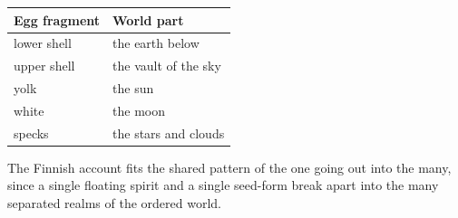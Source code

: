 \begin{longtable}{@{}
ll@{}}
\toprule
Egg fragment & World part \\
\midrule
lower shell & the earth below \\
upper shell & the vault of the sky \\
yolk & the sun \\
white & the moon \\
specks & the stars and clouds \\
\bottomrule
\end{longtable}

The Finnish account fits the shared pattern of the one going out into the many, since a single floating spirit and a single seed-form break apart into the many separated realms of the ordered world.
